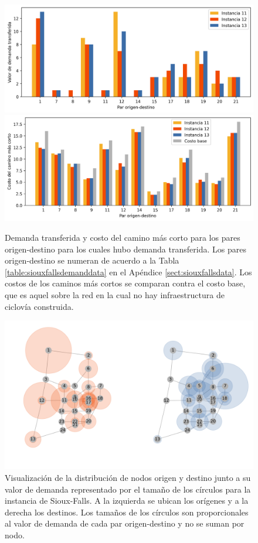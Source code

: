 \begin{figure}[h!]
  \centering
  \includegraphics[width=12cm]{../resources/sensibility_case_study_demand.png}
  \includegraphics[width=12cm]{../resources/sensibility_case_study_shortest_paths.png}
  \caption{Demanda transferida y costo del camino más corto para los pares origen-destino para los cuales hubo demanda transferida. Los pares origen-destino se numeran de acuerdo a la Tabla \ref{table:siouxfallsdemanddata} en el Apéndice \ref{sect:siouxfallsdata}. Los costos de los caminos más cortos se comparan contra el costo base, que es aquel sobre la red en la cual no hay infraestructura de ciclovía construida.}
  \label{fig:sensibilitybyodpair_11_12_13}
\end{figure}

\begin{figure}[h!]
  \centering
  \includegraphics[width=12cm]{../resources/sioux_falls_demand.png}
  \caption{Visualización de la distribución de nodos origen y destino junto a su valor de demanda representado por el tamaño de los círculos para la instancia de Sioux-Falls. A la izquierda se ubican los orígenes y a la derecha los destinos. Los tamaños de los círculos son proporcionales al valor de demanda de cada par origen-destino y no se suman por nodo.}
  \label{fig:sioux_falls_demand}
\end{figure}

